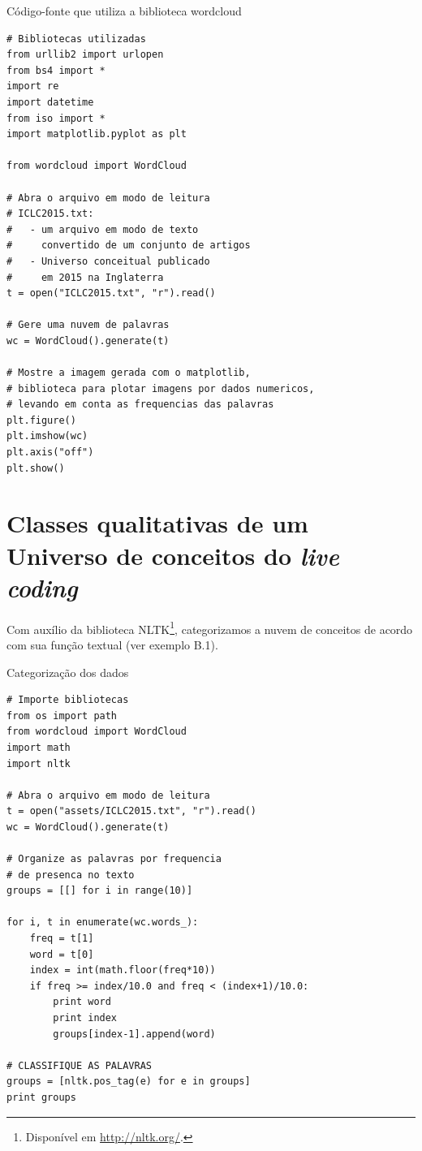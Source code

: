\begin{example}{Código-fonte que utiliza a biblioteca wordcloud}  
\begin{verbatim}
# Bibliotecas utilizadas
from urllib2 import urlopen
from bs4 import *
import re
import datetime
from iso import *
import matplotlib.pyplot as plt

from wordcloud import WordCloud
    
# Abra o arquivo em modo de leitura
# ICLC2015.txt: 
#   - um arquivo em modo de texto 
#     convertido de um conjunto de artigos
#   - Universo conceitual publicado
#     em 2015 na Inglaterra  
t = open("ICLC2015.txt", "r").read()

# Gere uma nuvem de palavras
wc = WordCloud().generate(t)
    
# Mostre a imagem gerada com o matplotlib,
# biblioteca para plotar imagens por dados numericos,
# levando em conta as frequencias das palavras
plt.figure()
plt.imshow(wc)
plt.axis("off")
plt.show()
\end{verbatim}
\label{cod:nuvem}
\end{example}

\section{Classes qualitativas de um Universo de conceitos do \emph{live coding}}

Com auxílio da biblioteca NLTK\footnote{Disponível em \url{http://nltk.org/}.}, categorizamos a nuvem de conceitos de acordo com sua função textual (ver exemplo B.1). 

\begin{example}{Categorização dos dados}
\begin{verbatim}
# Importe bibliotecas
from os import path
from wordcloud import WordCloud
import math
import nltk

# Abra o arquivo em modo de leitura
t = open("assets/ICLC2015.txt", "r").read()
wc = WordCloud().generate(t)

# Organize as palavras por frequencia
# de presenca no texto
groups = [[] for i in range(10)]

for i, t in enumerate(wc.words_):
    freq = t[1]
    word = t[0]
    index = int(math.floor(freq*10))
    if freq >= index/10.0 and freq < (index+1)/10.0:
        print word
        print index
        groups[index-1].append(word)

# CLASSIFIQUE AS PALAVRAS
groups = [nltk.pos_tag(e) for e in groups]
print groups
\end{verbatim}
\label{cod:classes}
\end{example}

